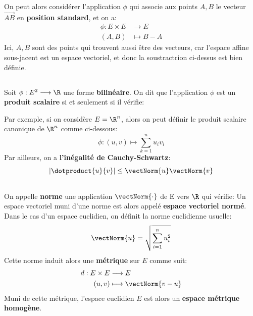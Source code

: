 On peut alors considérer l'application \(\phi\) qui associe aux points \(A, B\) le vecteur \(\overrightarrow{AB}\) en \textbf{position standard}, et on a:
\[
   \begin{aligned}
      \phi: E \times E &\longrightarrow E\\
      (A, B) &\longmapsto B - A
   \end{aligned}
\]
Ici, \(A, B\) sont des points qui trouvent aussi être des vecteurs, car l'espace affine sous-jacent est un espace vectoriel, et donc la soustractrion ci-dessus est bien définie.

\subsection*{}
Soit \(\phi : E^2 \longrightarrow \R\) une forme \textbf{bilinéaire}. On dit que l'application \(\phi\) est un \textbf{produit scalaire} si et seulement si il vérifie:


Par exemple, si on considère \(E = \R^n\), alors on peut définir le produit scalaire canonique de \(\R^n\) comme ci-dessous:
\[
   \phi : (u, v) \longmapsto \sum_{k=1}^{n} u_iv_i 
\]
Par ailleurs, on a \textbf{l'inégalité de Cauchy-Schwartz}:
\[
    |\dotproduct{u}{v}| \leq \vectNorm{u} \vectNorm{v}
\]

\subsection*{}
On appelle \textbf{norme} une application \(\vectNorm{\cdot}\) de E vers \(\R\) qui vérifie:
Un espace vectoriel muni d'une norme est alors appelé \textbf{espace vectoriel normé}. Dans le cas d'un espace euclidien, on définit la norme euclidienne usuelle:
\[
   \vectNorm{u} = \sqrt{\sum_{i=1}^n u_i^2}
\]
Cette norme induit alors une \textbf{métrique} sur \(E\)  comme suit:
\[
   \begin{aligned}
      d: E \times E &\longrightarrow E\\
      (u, v) &\longmapsto \vectNorm{v - u}
   \end{aligned}
\]
Muni de cette métrique, l'espace euclidien \(E\) est alors un \textbf{espace métrique homogène}.

